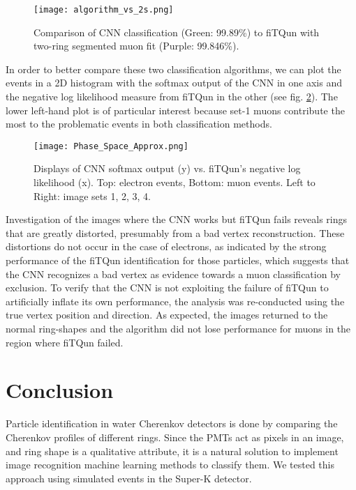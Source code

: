 \documentclass[twoside,twocolumn]{article}
\begin{document}
\begin{figure}[h]
    \centering
    \texttt{[image: algorithm\_vs\_2s.png]}
    \caption{Comparison of CNN classification (Green: 99.89\%) to fiTQun with two-ring segmented muon fit (Purple: 99.846\%).}
    \label{fig:algorithm_vs_2s}
\end{figure}

In order to better compare these two classification algorithms, we can plot the events in a 2D histogram with the softmax output of the CNN in one axis and the negative log likelihood measure from fiTQun in the other (see fig. \ref{fig:Phase_Space_Approx}). The lower left-hand plot is of particular interest because set-1 muons contribute the most to the problematic events in both classification methods.

\begin{figure}[h]
    \centering
    \texttt{[image: Phase\_Space\_Approx.png]}
    \caption{Displays of CNN softmax output (y) vs. fiTQun's negative log likelihood (x). Top: electron events, Bottom: muon events. Left to Right: image sets 1, 2, 3, 4.}
    \label{fig:Phase_Space_Approx}
\end{figure}

Investigation of the images where the CNN works but fiTQun fails reveals rings that are greatly distorted, presumably from a bad vertex reconstruction. These distortions do not occur in the case of electrons, as indicated by the strong performance of the fiTQun identification for those particles, which suggests that the CNN recognizes a bad vertex as evidence towards a muon classification by exclusion. To verify that the CNN is not exploiting the failure of fiTQun to artificially inflate its own performance, the analysis was re-conducted using the true vertex position and direction. As expected, the images returned to the normal ring-shapes and the algorithm did not lose performance for muons in the region where fiTQun failed.

\section{Conclusion}

Particle identification in water Cherenkov detectors is done by comparing the Cherenkov profiles of different rings. Since the PMTs act as pixels in an image, and ring shape is a qualitative attribute, it is a natural solution to implement image recognition machine learning methods to classify them. We tested this approach using simulated events in the Super-K detector.
\end{document}

